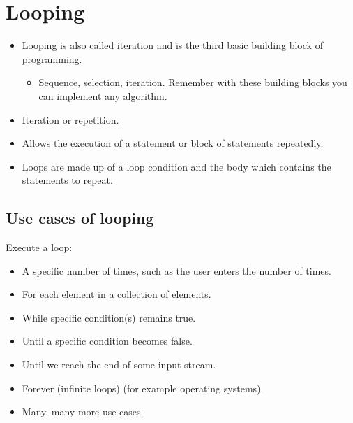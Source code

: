 \section{Looping}
\begin{itemize}
    \item Looping is also called iteration and is the third basic building block of programming. 
        \begin{itemize}
            \item Sequence, selection, iteration. Remember with these building blocks you can implement any algorithm.
        \end{itemize}
    
    \item Iteration or repetition.
    \item Allows the execution of a statement or block of statements repeatedly.
    \item Loops are made up of a loop condition and the body which contains the statements to repeat.
\end{itemize}

\subsection{Use cases of looping}
Execute a loop: 
\begin{itemize}
    \item A specific number of times, such as the user enters the number of times.
    \item For each element in a collection of elements.
    \item While specific condition(s) remains true.
    \item Until a specific condition becomes false.
    \item Until we reach the end of some input stream.
    \item Forever (infinite loops) (for example operating systems).
    \item Many, many more use cases.
\end{itemize}

